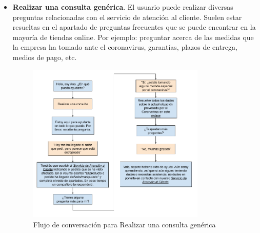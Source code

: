 \begin{itemize}
    \item \textbf{Realizar una consulta genérica}. El usuario puede realizar diversas preguntas relacionadas con el servicio de atención al cliente. Suelen estar resueltas en el apartado de preguntas frecuentes que se puede encontrar en la mayoría de tiendas online. Por ejemplo: preguntar acerca de las medidas que la empresa ha tomado ante el coronavirus, garantías, plazos de entrega, medios de pago, etc.
    \begin{figure}[ht]
    	\begin{center}
    		\includegraphics[width = 0.80\textwidth]{Figuras/Realizar consulta.png}
    	\end{center}
	\caption{\label{fig:realizarConsulta} Flujo de conversación para Realizar una consulta genérica}
    \end{figure}

\newpage
    

\end{itemize}
